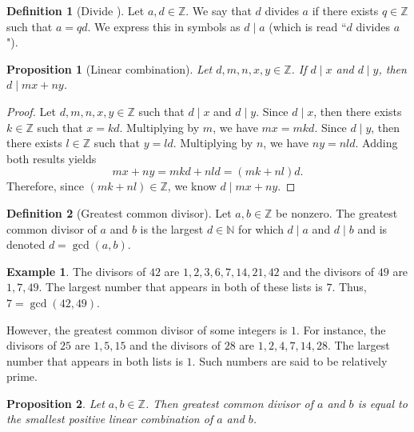 \documentclass[12pt, titlepage]{amsart}
\newcommand\Z{{\mathbb Z}}
\newcommand\N{{\mathbb N}}
\newtheorem{prop}{Proposition}[subsection]
\theoremstyle{definition}
\newtheorem{definition}{Definition}[subsection]
\newtheorem{example}{Example}[subsection]
\begin{document}
	\begin{definition}[Divide \cite{pommersheim}]\label{definition:divide}
		Let $a,d \in \Z$. We say that $d$ divides $a$ if there exists $q \in \Z$ such that $a = qd$. We express this in symbols as $d \mid a$ (which is read ``$d$ divides $a$").
	\end{definition}
		
	\begin{prop}[Linear combination]\label{proposition:linear_combination}
		Let $d,m,n,x,y \in \Z$. If $d \mid x$ and $d \mid y$, then $d \mid mx + ny$.
	\end{prop}
	
	\begin{proof}
		Let $d,m,n,x,y \in \Z$ such that $d \mid x$ and $d \mid y$.
		Since $d \mid x$, then there exists $k \in \Z$ such that $x = kd$.
		Multiplying by $m$, we have  $mx = mkd$.
		Since $d \mid y$, then there exists $l \in \Z$ such that $y = ld$.
		Multiplying by $n$, we have  $ny = nld$.
		Adding both results yields $$ mx + ny = mkd + nld = (mk+nl)d.$$
		Therefore, since $(mk+nl) \in \Z$, we know $d \mid mx + ny$.
	\end{proof}
	
	\begin{definition}[Greatest common divisor]\label{definition:gcd}
		Let $a,b \in \Z$ be nonzero. The greatest common divisor of $a$ and $b$ is the largest $d \in \N$ for which $d \mid a$ and $d \mid b$ and is denoted $d = \gcd(a,b)$.
	\end{definition}
	
	\begin{example}
		The divisors of $42$ are $1,2,3,6,7,14,21,42$ and the divisors of $49$ are $1,7,49$. The largest number that appears in both of these lists is $7$. Thus, $7 = \gcd(42,49)$.
	\end{example}
	
	However, the greatest common divisor of some integers is $1$. For instance, the divisors of $25$ are $1,5,15$ and the divisors of $28$ are $1,2,4,7,14,28$. The largest number that appears in both lists is $1$. Such numbers are said to be relatively prime.
	
	\begin{prop}\label{proposition:smallest_possible_linear_combination}
		Let $a,b \in \Z$. Then greatest common divisor of $a$ and $b$ is equal to the smallest positive linear combination of $a$ and $b$.
	\end{prop}
	
\end{document}
